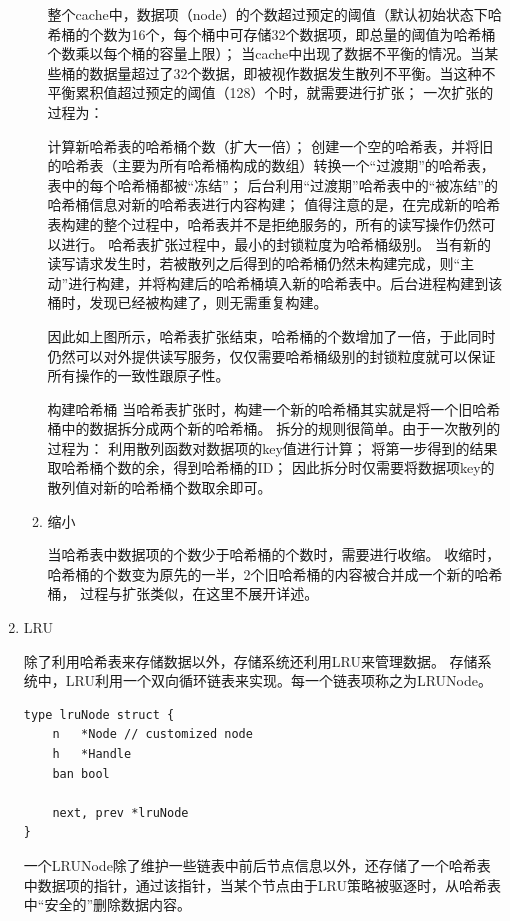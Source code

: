 \begin{enumerate}
\begin{enumerate}
整个cache中，数据项（node）的个数超过预定的阈值（默认初始状态下哈希桶的个数为16个，每个桶中可存储32个数据项，即总量的阈值为哈希桶个数乘以每个桶的容量上限）；
当cache中出现了数据不平衡的情况。当某些桶的数据量超过了32个数据，即被视作数据发生散列不平衡。当这种不平衡累积值超过预定的阈值（128）个时，就需要进行扩张；
一次扩张的过程为：

计算新哈希表的哈希桶个数（扩大一倍）；
创建一个空的哈希表，并将旧的哈希表（主要为所有哈希桶构成的数组）转换一个“过渡期”的哈希表，表中的每个哈希桶都被“冻结”；
后台利用“过渡期”哈希表中的“被冻结”的哈希桶信息对新的哈希表进行内容构建；
值得注意的是，在完成新的哈希表构建的整个过程中，哈希表并不是拒绝服务的，所有的读写操作仍然可以进行。
哈希表扩张过程中，最小的封锁粒度为哈希桶级别。
当有新的读写请求发生时，若被散列之后得到的哈希桶仍然未构建完成，则“主动”进行构建，并将构建后的哈希桶填入新的哈希表中。后台进程构建到该桶时，发现已经被构建了，则无需重复构建。

因此如上图所示，哈希表扩张结束，哈希桶的个数增加了一倍，于此同时仍然可以对外提供读写服务，仅仅需要哈希桶级别的封锁粒度就可以保证所有操作的一致性跟原子性。

构建哈希桶
当哈希表扩张时，构建一个新的哈希桶其实就是将一个旧哈希桶中的数据拆分成两个新的哈希桶。
拆分的规则很简单。由于一次散列的过程为：
利用散列函数对数据项的key值进行计算；
将第一步得到的结果取哈希桶个数的余，得到哈希桶的ID；
因此拆分时仅需要将数据项key的散列值对新的哈希桶个数取余即可。
				
				\item 缩小 
				
				当哈希表中数据项的个数少于哈希桶的个数时，需要进行收缩。
				收缩时，哈希桶的个数变为原先的一半，2个旧哈希桶的内容被合并成一个新的哈希桶，
				过程与扩张类似，在这里不展开详述。

			\end{enumerate}
		
		\item LRU 
		
		除了利用哈希表来存储数据以外，存储系统还利用LRU来管理数据。
存储系统中，LRU利用一个双向循环链表来实现。每一个链表项称之为LRUNode。

\begin{lstlisting}[caption=lruNode , label=code_radds_storage_lruNode]
type lruNode struct {
	n   *Node // customized node
	h   *Handle
	ban bool

	next, prev *lruNode
}
\end{lstlisting}

一个LRUNode除了维护一些链表中前后节点信息以外，还存储了一个哈希表中数据项的指针，通过该指针，当某个节点由于LRU策略被驱逐时，从哈希表中“安全的”删除数据内容。


\end{enumerate}

